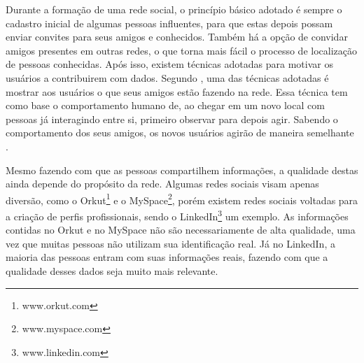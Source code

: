 
Durante a formação de uma rede social, o princípio básico adotado é sempre o cadastro inicial de algumas pessoas influentes, para que estas depois possam enviar convites para seus amigos e conhecidos. Também há a opção de convidar amigos presentes em outras redes, o que torna mais fácil o processo de localização de pessoas conhecidas. Após isso, existem técnicas adotadas para motivar os usuários a contribuirem com dados. Segundo \cite{burke2009fmm}, uma das técnicas adotadas é mostrar aos usuários o que seus amigos estão fazendo na rede. Essa técnica tem como base o comportamento humano de, ao chegar em um novo local com pessoas já interagindo entre si, primeiro observar para depois agir. Sabendo o comportamento dos seus amigos, os novos usuários agirão de maneira semelhante \cite{burke2009fmm}.

Mesmo fazendo com que as pessoas compartilhem informações, a qualidade destas ainda depende do propósito da rede. Algumas redes sociais visam apenas diversão, como o Orkut\footnote{www.orkut.com} e o MySpace\footnote{www.myspace.com}, porém existem redes sociais voltadas para a criação de perfis profissionais, sendo o LinkedIn\footnote{www.linkedin.com} um exemplo. As informações contidas no Orkut e no MySpace não são necessariamente de alta qualidade, uma vez que muitas pessoas não utilizam sua identificação real. Já no LinkedIn, a maioria das pessoas entram com suas informações reais, fazendo com que a qualidade desses dados seja muito mais relevante.





